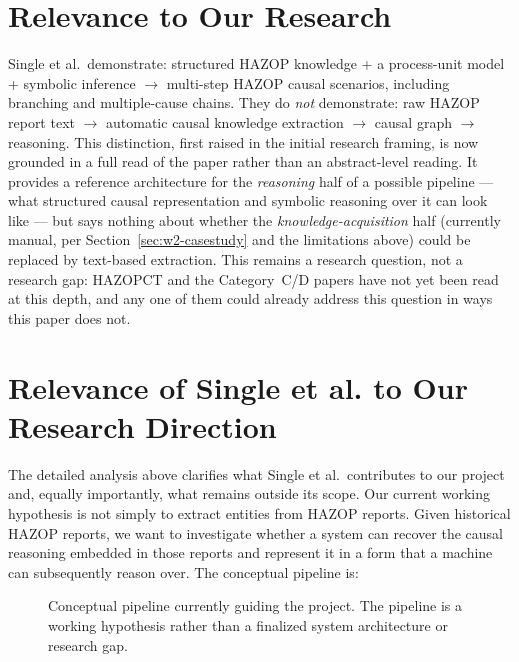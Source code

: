 \section{Relevance to Our Research}
\begin{provisional}
Single et al.\ demonstrate: structured HAZOP knowledge + a process-unit model
+ symbolic inference $\rightarrow$ multi-step HAZOP causal scenarios, including
branching and multiple-cause chains. They do \emph{not} demonstrate: raw
HAZOP report text $\rightarrow$ automatic causal knowledge extraction
$\rightarrow$ causal graph $\rightarrow$ reasoning. This distinction, first
raised in the initial research framing, is now grounded in a full read of the
paper rather than an abstract-level reading. It provides a reference
architecture for the \emph{reasoning} half of a possible pipeline --- what
structured causal representation and symbolic reasoning over it can look
like --- but says nothing about whether the \emph{knowledge-acquisition}
half (currently manual, per Section~\ref{sec:w2-casestudy} and the
limitations above) could be replaced by text-based extraction. This
remains a research question, not a research gap: HAZOPCT and the
Category~C/D papers have not yet been read at this depth, and
any one of them could already address this question in ways this paper
does not.
\end{provisional}

\section{Relevance of Single et al. to Our Research Direction}
The detailed analysis above clarifies what Single et al.\ contributes to our
project and, equally importantly, what remains outside its scope. Our current
working hypothesis is not simply to extract entities from HAZOP reports. Given
historical HAZOP reports, we want to investigate whether a system can recover
the causal reasoning embedded in those reports and represent it in a form that
a machine can subsequently reason over. The conceptual pipeline is:

\begin{figure}[htbp]
\centering
{}%
\caption[Current working pipeline for the project]{Conceptual pipeline
currently guiding the project. The pipeline is a working hypothesis rather
than a finalized system architecture or research gap.}
\label{fig:w2-our-pipeline}
\end{figure}

